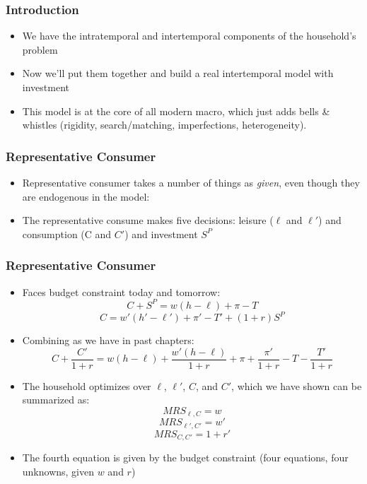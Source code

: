 \documentclass{beamer}
\author{Trevor S. Gallen}
\date{}
\begin{document}
\renewcommand*{\inserttotalframenumber}{\pageref{lastframe}}



\begin{frame}
\titlepage
\end{frame}

\begin{frame}
\frametitle[alignment=center]{Introduction}
\begin{itemize}
\item We have the intratemporal and intertemporal components of the household's problem
\bigskip
\item Now we'll put them together and build a real intertemporal model with investment
\bigskip
\item This model is at the core of all modern macro, which just adds bells \& whistles (rigidity, search/matching, imperfections, heterogeneity).
\end{itemize}
\end{frame}

\begin{frame}
\frametitle[alignment=center]{Representative Consumer}
\begin{itemize}
\item Representative consumer takes a number of things as \emph{given}, even though they are endogenous in the model:
\item The representative consume makes five decisions: leisure ($\ell$ and $\ell'$) and consumption (C and $C'$) and investment $S^P$
\end{itemize}
\end{frame}


\begin{frame}
\frametitle[alignment=center]{Representative Consumer}
\begin{itemize}
\item Faces budget constraint today and tomorrow:
$$C+S^P=w(h-\ell)+\pi-T$$
$$C= w'(h'-\ell')+\pi'-T'+(1+r)S^P$$
\item Combining as we have in past chapters:
$$C+\frac{C'}{1+r}=w(h-\ell)+\frac{w'(h-\ell)}{1+r}+\pi+\frac{\pi'}{1+r}-T-\frac{T'}{1+r}$$
\item The household optimizes over $\ell$, $\ell'$, $C$, and $C'$, which we have shown can be summarized as:
$$MRS_{\ell,C}=w$$
$$MRS_{\ell',C'}=w'$$
$$MRS_{C,C'}=1+r'$$
\item The fourth equation is given by the budget constraint (four equations, four unknowns, given $w$ and $r$)
\end{itemize}
\end{frame}
\end{document}
